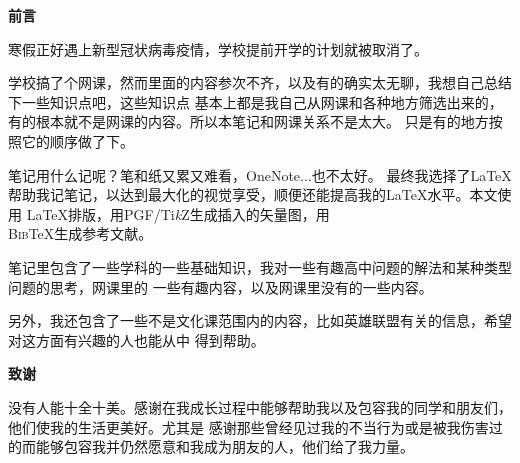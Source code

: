 \begin{center}
\begin{LARGE}
\textbf{前言}
\end{LARGE}
\end{center}

寒假正好遇上新型冠状病毒疫情，学校提前开学的计划就被取消了。

学校搞了个网课，然而里面的内容参次不齐，以及有的确实太无聊，我想自己总结下一些知识点吧，这些知识点
基本上都是我自己从网课和各种地方筛选出来的，有的根本就不是网课的内容。所以本笔记和网课关系不是太大。
只是有的地方按照它的顺序做了下。

笔记用什么记呢？笔和纸又累又难看，OneNote...也不太好。
最终我选择了\LaTeX 帮助我记笔记，以达到最大化的视觉享受，顺便还能提高我的\LaTeX 水平。本文使用
\LaTeX 排版，用PGF/Ti\emph{k}Z生成插入的矢量图，用\\
B\textsc{ib}\TeX 生成参考文献。

笔记里包含了一些学科的一些基础知识，我对一些有趣高中问题的解法和某种类型问题的思考，网课里的
一些有趣内容，以及网课里没有的一些内容。

另外，我还包含了一些不是文化课范围内的内容，比如英雄联盟有关的信息，希望对这方面有兴趣的人也能从中
得到帮助。

\medskip
\begin{center}
\begin{LARGE}
\textbf{致谢}
\end{LARGE}
\end{center}
没有人能十全十美。感谢在我成长过程中能够帮助我以及包容我的同学和朋友们，他们使我的生活更美好。尤其是
感谢那些曾经见过我的不当行为或是被我伤害过的而能够包容我并仍然愿意和我成为朋友的人，他们给了我力量。